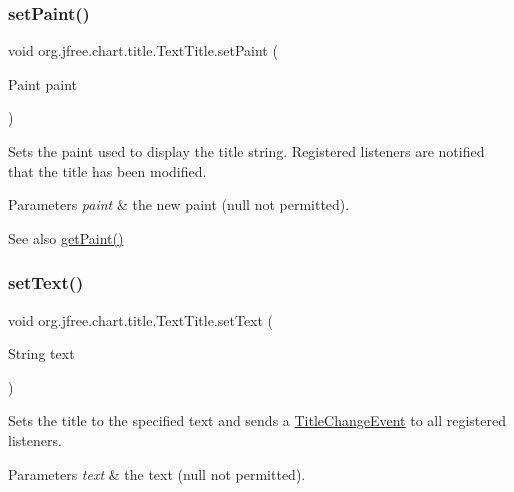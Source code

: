 \subsubsection{\texorpdfstring{set\+Paint()}{setPaint()}}
{\footnotesize\ttfamily void org.\+jfree.\+chart.\+title.\+Text\+Title.\+set\+Paint (\begin{DoxyParamCaption}\item[{Paint}]{paint }\end{DoxyParamCaption})}

Sets the paint used to display the title string. Registered listeners are notified that the title has been modified.


\begin{DoxyParams}{Parameters}
{\em paint} & the new paint ({\ttfamily null} not permitted).\\
\hline
\end{DoxyParams}
\begin{DoxySeeAlso}{See also}
\mbox{\hyperlink{classorg_1_1jfree_1_1chart_1_1title_1_1_text_title_a28e3edf87989ddb4c93854709c044aa0}{get\+Paint()}} 
\end{DoxySeeAlso}
\mbox{\label{classorg_1_1jfree_1_1chart_1_1title_1_1_text_title_a785cbdf64eec81ca253a3767c415547c}} 
\subsubsection{\texorpdfstring{set\+Text()}{setText()}}
{\footnotesize\ttfamily void org.\+jfree.\+chart.\+title.\+Text\+Title.\+set\+Text (\begin{DoxyParamCaption}\item[{String}]{text }\end{DoxyParamCaption})}

Sets the title to the specified text and sends a \mbox{\hyperlink{}{Title\+Change\+Event}} to all registered listeners.


\begin{DoxyParams}{Parameters}
{\em text} & the text ({\ttfamily null} not permitted). \\
\hline
\end{DoxyParams}
\mbox{\label{classorg_1_1jfree_1_1chart_1_1title_1_1_text_title_aa0cf2a633b5739b99364223454b1c705}} 
